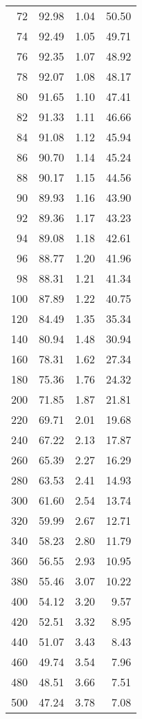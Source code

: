 \begin{table}[ht]
\begin{tabular}{rrrr}
     72 & 92.98 & 1.04 & 50.50 \\ 
     74 & 92.49 & 1.05 & 49.71 \\ 
     76 & 92.35 & 1.07 & 48.92 \\ 
     78 & 92.07 & 1.08 & 48.17 \\ 
     80 & 91.65 & 1.10 & 47.41 \\ 
     82 & 91.33 & 1.11 & 46.66 \\ 
     84 & 91.08 & 1.12 & 45.94 \\ 
     86 & 90.70 & 1.14 & 45.24 \\ 
     88 & 90.17 & 1.15 & 44.56 \\ 
     90 & 89.93 & 1.16 & 43.90 \\ 
     92 & 89.36 & 1.17 & 43.23 \\ 
     94 & 89.08 & 1.18 & 42.61 \\ 
     96 & 88.77 & 1.20 & 41.96 \\ 
     98 & 88.31 & 1.21 & 41.34 \\ 
    100 & 87.89 & 1.22 & 40.75 \\ 
    120 & 84.49 & 1.35 & 35.34 \\ 
    140 & 80.94 & 1.48 & 30.94 \\ 
    160 & 78.31 & 1.62 & 27.34 \\ 
    180 & 75.36 & 1.76 & 24.32 \\ 
    200 & 71.85 & 1.87 & 21.81 \\ 
    220 & 69.71 & 2.01 & 19.68 \\ 
    240 & 67.22 & 2.13 & 17.87 \\ 
    260 & 65.39 & 2.27 & 16.29 \\ 
    280 & 63.53 & 2.41 & 14.93 \\ 
    300 & 61.60 & 2.54 & 13.74 \\ 
    320 & 59.99 & 2.67 & 12.71 \\ 
    340 & 58.23 & 2.80 & 11.79 \\ 
    360 & 56.55 & 2.93 & 10.95 \\ 
    380 & 55.46 & 3.07 & 10.22 \\ 
    400 & 54.12 & 3.20 & 9.57 \\ 
    420 & 52.51 & 3.32 & 8.95 \\ 
    440 & 51.07 & 3.43 & 8.43 \\ 
    460 & 49.74 & 3.54 & 7.96 \\ 
    480 & 48.51 & 3.66 & 7.51 \\ 
    500 & 47.24 & 3.78 & 7.08 \\ 

\end{tabular}
\end{table}
